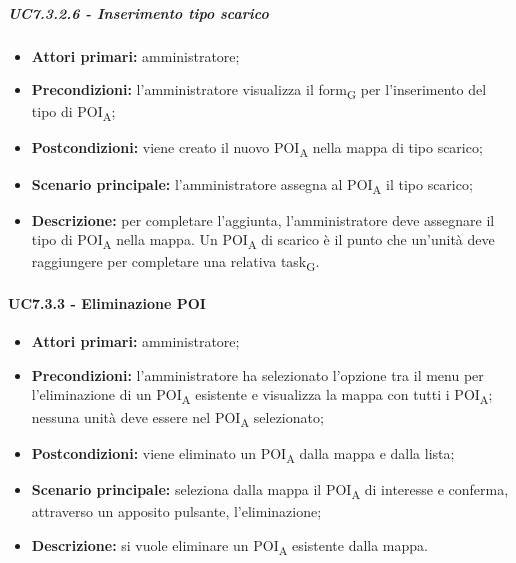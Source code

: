 \subparagraph{UC7.3.2.6 - Inserimento tipo scarico}

\begin{itemize}

   \item   \textbf{Attori primari:} amministratore;

   \item   \textbf{Precondizioni:} l'amministratore visualizza il form\textsubscript{G} per l'inserimento del tipo di POI\textsubscript{A};

   \item   \textbf{Postcondizioni:} viene creato il nuovo POI\textsubscript{A} nella mappa di tipo scarico; 

   \item   \textbf{Scenario principale:} l'amministratore assegna al POI\textsubscript{A} il tipo scarico;

  \item   \textbf{Descrizione:} per completare l'aggiunta, l'amministratore deve assegnare il tipo di POI\textsubscript{A} nella mappa. Un POI\textsubscript{A} di scarico è il punto che un'unità deve raggiungere per completare una relativa task\textsubscript{G}.



\end{itemize}





\paragraph{UC7.3.3 - Eliminazione POI}

\begin{itemize}

   \item   \textbf{Attori primari:} amministratore;

   \item   \textbf{Precondizioni:} l'amministratore ha selezionato l'opzione tra il menu per l'eliminazione di un POI\textsubscript{A} esistente e visualizza la mappa con tutti i POI\textsubscript{A}; nessuna unità deve essere nel POI\textsubscript{A} selezionato;

   \item   \textbf{Postcondizioni:} viene eliminato un POI\textsubscript{A} dalla mappa e dalla lista; 

   \item   \textbf{Scenario principale:} seleziona dalla mappa il POI\textsubscript{A} di interesse e conferma, attraverso un apposito pulsante, l'eliminazione;

   \item   \textbf{Descrizione:} si vuole eliminare un POI\textsubscript{A} esistente dalla mappa.

\end{itemize}
